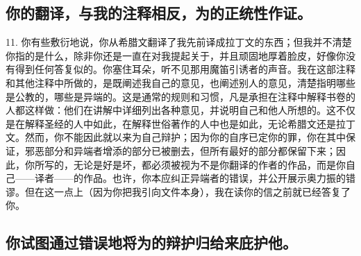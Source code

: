 
\subsection{你的翻译，与我的注释相反，为的正统性作证。}

11. 你有些敷衍地说，你从希腊文翻译了我先前译成拉丁文的东西；但我并不清楚你指的是什么，除非你还是一直在对我提起关于，并且顽固地厚着脸皮，好像你没有得到任何答复似的。你塞住耳朵，听不见那用魔笛引诱者的声音。我在这部注释和其他注释中所做的，是既阐述我自己的意见，也阐述别人的意见，清楚指明哪些是公教的，哪些是异端的。这是通常的规则和习惯，凡是承担在注释中解释书卷的人都这样做：他们在讲解中详细列出各种意见，并说明自己和他人所想的。这不仅是在解释圣经的人中如此，在解释世俗著作的人中也是如此，无论希腊文还是拉丁文。然而，你不能因此就以来为自己辩护；因为你的自序已定你的罪，你在其中保证，邪恶部分和异端者增添的部分已被删去，但所有最好的部分都保留下来；因此，你所写的，无论是好是坏，都必须被视为不是你翻译的作者的作品，而是你自己——译者——的作品。也许，你本应纠正异端者的错误，并公开展示奥力振的错谬。但在这一点上（因为你把我引向文件本身），我在读你的信之前就已经答复了你。\par


\subsection{你试图通过错误地将为的辩护归给来庇护他。}

